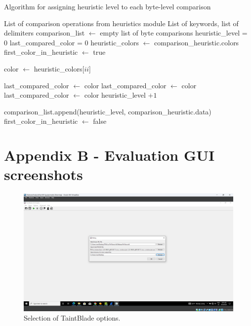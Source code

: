 \documentclass[conference]{IEEEtran}
\begin{document}
\begin{algorithm}[H]
    \caption{Algorithm for assigning heuristic level to each byte-level comparison}
    \label{alg:heuristic_level}
    \begin{algorithmic}[1]
    \renewcommand{\algorithmicrequire}{\textbf{Input:}}
    \renewcommand{\algorithmicensure}{\textbf{Output:}}
    \REQUIRE List of comparison operations from heuristics module
    \ENSURE  List of keywords, list of delimiters
    \STATE comparison\_list $\gets$ empty list of byte comparisons
    \STATE heuristic\_level = 0
    \STATE last\_compared\_color = 0    
        \STATE heuristic\_colors $\gets$ comparison\_heuristic.colors
        \STATE first\_color\_in\_heuristic $\gets$ true
        
            \STATE color $\gets$ heuristic\_colors[$ii$]
            
                \STATE last\_compared\_color $\gets$ color
                \STATE last\_compared\_color $\gets$ color
            \ELSE
                \STATE last\_compared\_color $\gets$ color
                \STATE heuristic\_level $+ 1$
            \ENDIF
            
            \STATE comparison\_list.append(heuristic\_level, comparison\_heuristic.data)
            \STATE first\_color\_in\_heuristic $\gets$ false
        \ENDFOR
    \ENDFOR
    \end{algorithmic}
\end{algorithm}




\onecolumn
\section*{Appendix B - Evaluation GUI screenshots}\label{appendix_eval_screenshots}
\begin{figure}[htbp]
    \centerline{\includegraphics[width=\textwidth]{images/sch_s1.png}}
    \caption{Selection of TaintBlade options.}
    \label{figure:ap_sch_s1}
\end{figure}
\end{document}
